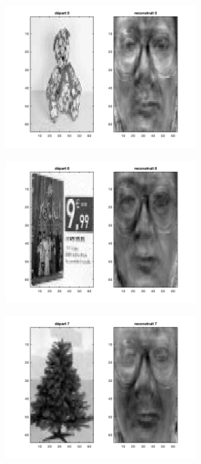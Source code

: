 \documentclass[a4paper]{article}
\begin{document}
\begin{figure}[H]
    \begin{subfigure}[c]{0.24\textwidth}
        \centering
        \includegraphics[width=0.8\textwidth]{images/ex5_noface5.png}
    \end{subfigure}    
    \begin{subfigure}[c]{0.24\textwidth}
        \centering
        \includegraphics[width=0.8\textwidth]{images/ex5_noface6.png}
    \end{subfigure}    
    \begin{subfigure}[c]{0.24\textwidth}
        \centering
        \includegraphics[width=0.8\textwidth]{images/ex5_noface7.png}

\end{subfigure}
\end{figure}
\end{document}

